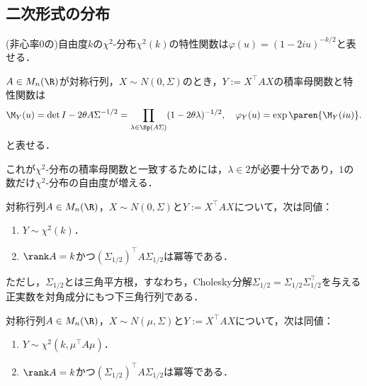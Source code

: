 \documentclass[uplatex,dvipdfmx]{jsreport}
\begin{document}
\subsection{二次形式の分布}

\begin{tcolorbox}[colframe=ForestGreen, colback=ForestGreen!10!white,breakable,colbacktitle=ForestGreen!40!white,coltitle=black,fonttitle=\bfseries\sffamily,
title=]
    (非心率$0$の)自由度$k$の$\chi^2$-分布$\chi^2(k)$の特性関数は$\varphi(u)=(1-2iu)^{-k/2}$と表せる．
\end{tcolorbox}

\begin{theorem}[正規確率変数の二次形式]
    $A\in M_n(\R)$が対称行列，$X\sim N(0,\Sigma)$のとき，$Y:=X^\top AX$の積率母関数と特性関数は
    \[\M_Y(u)=\det{I-2\theta A\Sigma}^{-1/2}=\prod_{\lambda\in\Sp(A\Sigma)}(1-2\theta\lambda)^{-1/2},\quad\varphi_Y(u)=\exp\paren{\M_Y(iu)}.\]
    と表せる．
\end{theorem}
\begin{remarks}
    これが$\chi^2$-分布の積率母関数と一致するためには，$\lambda\in2$が必要十分であり，$1$の数だけ$\chi^2$-分布の自由度が増える．
\end{remarks}

\begin{corollary}
    対称行列$A\in M_n(\R)$，$X\sim N(0,\Sigma)$と$Y:=X^\top AX$について，次は同値：
    \begin{enumerate}
        \item $Y\sim \chi^2(k)$．
        \item $\rank A=k$かつ$(\Sigma_{1/2})^\top A\Sigma_{1/2}$は冪等である．
    \end{enumerate}
    ただし，$\Sigma_{1/2}$とは三角平方根，すなわち，Cholesky分解$\Sigma_{1/2}=\Sigma_{1/2}\Sigma_{1/2}^\top$を与える正実数を対角成分にもつ下三角行列である．
\end{corollary}

\begin{proposition}
    対称行列$A\in M_n(\R)$，$X\sim N(\mu,\Sigma)$と$Y:=X^\top AX$について，次は同値：
    \begin{enumerate}
        \item $Y\sim\chi^2(k,\mu^\top A\mu)$．
        \item $\rank A=k$かつ$(\Sigma_{1/2})^\top A\Sigma_{1/2}$は冪等である．
    \end{enumerate}
\end{proposition}
\end{document}
